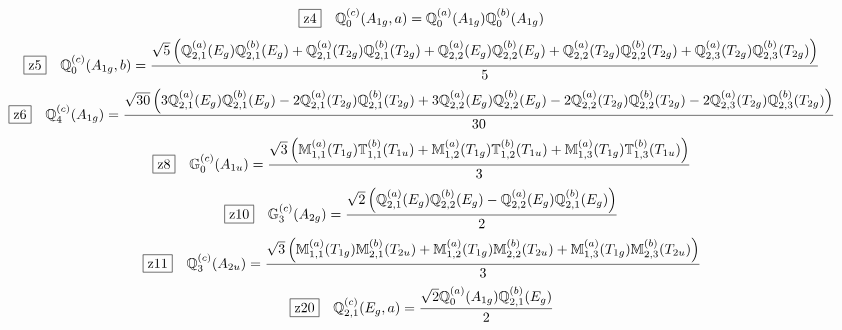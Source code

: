 \documentclass[fleqn,10pt,landscape]{jsarticle}
\begin{document}
\begin{dmath*}
\hspace*{3mm}\fbox{z4}\quad \mathbb{Q}_{0}^{(c)}(A_{1g},a)=\mathbb{Q}_{0}^{(a)}(A_{1g}) \mathbb{Q}_{0}^{(b)}(A_{1g})
\end{dmath*}
\begin{dmath*}
\hspace*{3mm}\fbox{z5}\quad \mathbb{Q}_{0}^{(c)}(A_{1g},b)=\frac{\sqrt{5} \left(\mathbb{Q}_{2,1}^{(a)}(E_{g}) \mathbb{Q}_{2,1}^{(b)}(E_{g}) + \mathbb{Q}_{2,1}^{(a)}(T_{2g}) \mathbb{Q}_{2,1}^{(b)}(T_{2g}) + \mathbb{Q}_{2,2}^{(a)}(E_{g}) \mathbb{Q}_{2,2}^{(b)}(E_{g}) + \mathbb{Q}_{2,2}^{(a)}(T_{2g}) \mathbb{Q}_{2,2}^{(b)}(T_{2g}) + \mathbb{Q}_{2,3}^{(a)}(T_{2g}) \mathbb{Q}_{2,3}^{(b)}(T_{2g})\right)}{5}
\end{dmath*}
\begin{dmath*}
\hspace*{3mm}\fbox{z6}\quad \mathbb{Q}_{4}^{(c)}(A_{1g})=\frac{\sqrt{30} \left(3 \mathbb{Q}_{2,1}^{(a)}(E_{g}) \mathbb{Q}_{2,1}^{(b)}(E_{g}) - 2 \mathbb{Q}_{2,1}^{(a)}(T_{2g}) \mathbb{Q}_{2,1}^{(b)}(T_{2g}) + 3 \mathbb{Q}_{2,2}^{(a)}(E_{g}) \mathbb{Q}_{2,2}^{(b)}(E_{g}) - 2 \mathbb{Q}_{2,2}^{(a)}(T_{2g}) \mathbb{Q}_{2,2}^{(b)}(T_{2g}) - 2 \mathbb{Q}_{2,3}^{(a)}(T_{2g}) \mathbb{Q}_{2,3}^{(b)}(T_{2g})\right)}{30}
\end{dmath*}
\begin{dmath*}
\hspace*{3mm}\fbox{z8}\quad \mathbb{G}_{0}^{(c)}(A_{1u})=\frac{\sqrt{3} \left(\mathbb{M}_{1,1}^{(a)}(T_{1g}) \mathbb{T}_{1,1}^{(b)}(T_{1u}) + \mathbb{M}_{1,2}^{(a)}(T_{1g}) \mathbb{T}_{1,2}^{(b)}(T_{1u}) + \mathbb{M}_{1,3}^{(a)}(T_{1g}) \mathbb{T}_{1,3}^{(b)}(T_{1u})\right)}{3}
\end{dmath*}
\begin{dmath*}
\hspace*{3mm}\fbox{z10}\quad \mathbb{G}_{3}^{(c)}(A_{2g})=\frac{\sqrt{2} \left(\mathbb{Q}_{2,1}^{(a)}(E_{g}) \mathbb{Q}_{2,2}^{(b)}(E_{g}) - \mathbb{Q}_{2,2}^{(a)}(E_{g}) \mathbb{Q}_{2,1}^{(b)}(E_{g})\right)}{2}
\end{dmath*}
\begin{dmath*}
\hspace*{3mm}\fbox{z11}\quad \mathbb{Q}_{3}^{(c)}(A_{2u})=\frac{\sqrt{3} \left(\mathbb{M}_{1,1}^{(a)}(T_{1g}) \mathbb{M}_{2,1}^{(b)}(T_{2u}) + \mathbb{M}_{1,2}^{(a)}(T_{1g}) \mathbb{M}_{2,2}^{(b)}(T_{2u}) + \mathbb{M}_{1,3}^{(a)}(T_{1g}) \mathbb{M}_{2,3}^{(b)}(T_{2u})\right)}{3}
\end{dmath*}
\begin{dmath*}
\hspace*{3mm}\fbox{z20}\quad \mathbb{Q}_{2,1}^{(c)}(E_{g},a)=\frac{\sqrt{2} \mathbb{Q}_{0}^{(a)}(A_{1g}) \mathbb{Q}_{2,1}^{(b)}(E_{g})}{2}
\end{dmath*}
\end{document}
